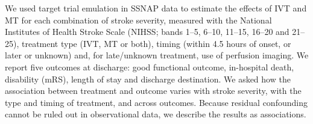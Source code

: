 We used target trial emulation in SSNAP data to estimate the effects of IVT and MT for each combination of stroke severity, measured with the National Institutes of Health Stroke Scale (NIHSS; bands 1--5, 6--10, 11--15, 16--20 and 21--25), treatment type (IVT, MT or both), timing (within 4.5 hours of onset, or later or unknown) and, for late/unknown treatment, use of perfusion imaging. We report five outcomes at discharge: good functional outcome, in-hospital death, disability (mRS), length of stay and discharge destination. We asked how the association between treatment and outcome varies with stroke severity, with the type and timing of treatment, and across outcomes. Because residual confounding cannot be ruled out in observational data, we describe the results as associations.
